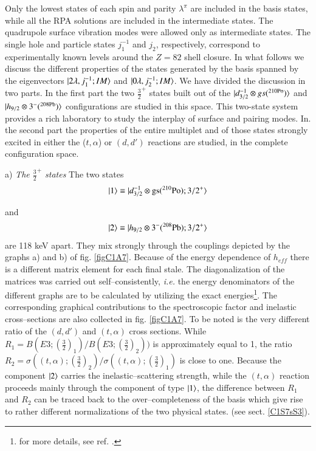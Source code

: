 Only the lowest states of each spin and parity $\lambda^{\pi}$ are included in the basis states, while all the RPA solutions are included in the intermediate states. The quadrupole surface vibration modes were allowed only as intermediate states. The single hole and particle states $j_1^{-1}$ and $j_2$, respectively, correspond to experimentally known levels around the $Z = 82$ shell closure. 
In what follows we discuss the different properties of the states generated by the basis spanned by the eigenvectors $|{2\lambda,j_1^{-1};IM} \rangle$ and $|{0\lambda,j_2^{-1};IM} \rangle$. We have divided the discussion in two parts. 
In the first part the two $\frac{3}{2}^+$ states built out of the $|{d_{3/2}^{-1}\otimes gs(^{210\text{Po}})} \rangle$ and $|{h_{9/2}\otimes 3^{-}(^{208\text{Pb}})} \rangle$ configurations are studied in this space. This two-state system provides a rich laboratory to study the interplay of surface and pairing modes. 
In. the second part the properties of the entire multiplet and of those states strongly excited in either the ($t,\alpha$) or $(d, d')$ reactions are studied, in the complete configuration space. 

a) \textit{The $\frac{3}{2}^+$ states }
The two states 
  \begin{align}\label{eqC1A89} 
   |{1} \rangle\equiv |{d_{3/2}^{-1}\otimes \text{gs}(^{210}\text{Po});3/2^+} \rangle
    \end{align} 


and 
  \begin{align}\label{eqC1A90} 
      |{2} \rangle\equiv |{h_{9/2}\otimes 3^-(^{208}\text{Pb});3/2^+} \rangle
    \end{align} 
are 118 keV apart. They mix strongly through the couplings depicted by the graphs a) and b) of fig. \ref{figC1A7}. Because of the energy dependence of $h_{eff}$ there is a different matrix element 
for each final stale. The diagonalization of the matrices was carried out self--consistently, \textit{i.e.} the energy denominators of the different graphs are to be calculated by utilizing the exact energies\footnote{for more details, see ref. \cite{Bortignon:77}.}. 
The corresponding graphical contributions to the spectroscopic factor and inelastic cross--sections are also collected in fig. \ref{figC1A7}. To be noted is the very different ratio of the $(d,d')$ and $(t,\alpha)$ cross sections. While $R_1=B(E3;(\frac{3}{2})_1)/B(E3;(\frac{3}{2})_2))$ is approximately equal to 1, the ratio $R_2=\sigma((t,\alpha);(\frac{3}{2})_2)/\sigma((t,\alpha);(\frac{3}{2})_1)$ is close to one. Because the component $|{2} \rangle$ carries the inelastic--scattering strength, while the $(t,\alpha)$ reaction proceeds mainly through the component of type $|{1} \rangle$, the difference between $R_1$ and $R_2$ can be traced back to the over--completeness of the basis which give rise to rather different normalizations of the two physical states. (see sect. \ref{C1S7sS3}).

